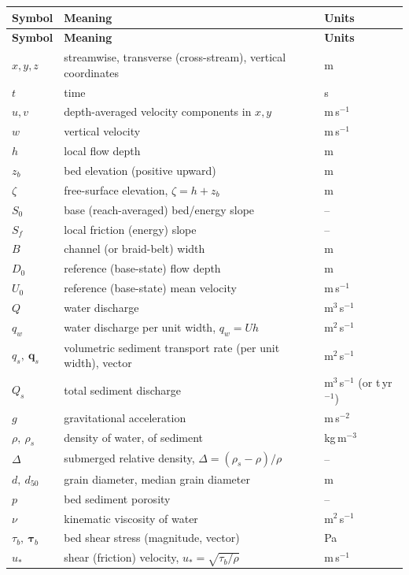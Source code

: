 \documentclass[11pt,a4paper]{report}
\theoremstyle{definition}
\theoremstyle{plain}
\theoremstyle{remark}
\newcommand{\vect}[1]{\boldsymbol{#1}}
\begin{document}
\begin{longtable}{@{}p{2.6cm}p{9.6cm}p{2.4cm}@{}}
\toprule
\textbf{Symbol} & \textbf{Meaning} & \textbf{Units} \\
\midrule
\endfirsthead
\toprule
\textbf{Symbol} & \textbf{Meaning} & \textbf{Units} \\
\midrule
\endhead
$x,y,z$ & streamwise, transverse (cross-stream), vertical coordinates & m \\
$t$ & time & s \\
$u,v$ & depth-averaged velocity components in $x,y$ & m\,s$^{-1}$ \\
$w$ & vertical velocity & m\,s$^{-1}$ \\
$h$ & local flow depth & m \\
$z_b$ & bed elevation (positive upward) & m \\
$\zeta$ & free-surface elevation, $\zeta = h+z_b$ & m \\
$S_0$ & base (reach-averaged) bed/energy slope & -- \\
$S_f$ & local friction (energy) slope & -- \\
$B$ & channel (or braid-belt) width & m \\
$D_0$ & reference (base-state) flow depth & m \\
$U_0$ & reference (base-state) mean velocity & m\,s$^{-1}$ \\
$Q$ & water discharge & m$^3$\,s$^{-1}$ \\
$q_w$ & water discharge per unit width, $q_w=Uh$ & m$^2$\,s$^{-1}$ \\
$q_s,\ \vect{q}_s$ & volumetric sediment transport rate (per unit width), vector & m$^2$\,s$^{-1}$ \\
$Q_s$ & total sediment discharge & m$^3$\,s$^{-1}$ (or t\,yr$^{-1}$) \\
$g$ & gravitational acceleration & m\,s$^{-2}$ \\
$\rho,\ \rho_s$ & density of water, of sediment & kg\,m$^{-3}$ \\
$\Delta$ & submerged relative density, $\Delta=(\rho_s-\rho)/\rho$ & -- \\
$d,\ d_{50}$ & grain diameter, median grain diameter & m \\
$p$ & bed sediment porosity & -- \\
$\nu$ & kinematic viscosity of water & m$^2$\,s$^{-1}$ \\
$\tau_b,\ \vect{\tau}_b$ & bed shear stress (magnitude, vector) & Pa \\
$u_*$ & shear (friction) velocity, $u_*=\sqrt{\tau_b/\rho}$ & m\,s$^{-1}$ \\

\end{longtable}
\end{document}
